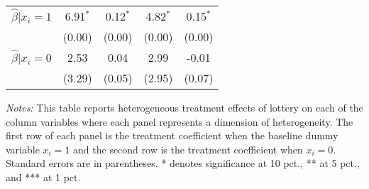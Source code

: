 \begin{table}[htbp]
{\begin{threeparttable}
\begin{tabular}{l*{4}{c}}
\hspace{0.5cm} \(\hat\beta|x_i=1\)&6.91$^{*}$&0.12$^{*}$&4.82$^{*}$&0.15$^{*}$\\
                &   (0.00)&   (0.00)&   (0.00)&   (0.00)\\
\hspace{0.5cm} \(\hat\beta|x_i=0\)&     2.53&     0.04&     2.99&    -0.01\\
                &   (3.29)&   (0.05)&   (2.95)&   (0.07)\\
\bottomrule \end{tabular} \begin{tablenotes}[flushleft] \footnotesize \item \emph{Notes:} This table reports heterogeneous treatment effects of lottery on each of the column variables where each panel represents a dimension of heterogeneity. The first row of each panel is the treatment coefficient when the baseline dummy variable \(x_i = 1\) and the second row is the treatment coefficient when \(x_i = 0\). Standard errors are in parentheses. * denotes significance at 10 pct., ** at 5 pct., and *** at 1 pct. \end{tablenotes} \end{threeparttable} } \end{table}

